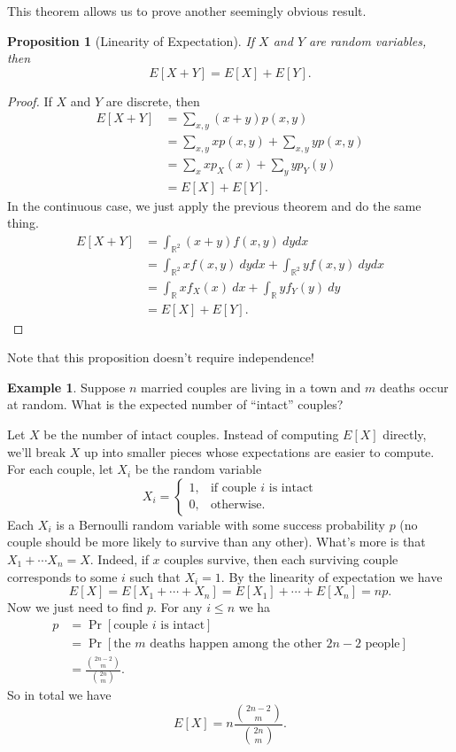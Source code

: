 \documentclass[12pt]{article}
\theoremstyle{plain}
\newtheorem{proposition}[theorem]{Proposition}
\theoremstyle{definition}
\newtheorem{example}[theorem]{Example}
\theoremstyle{remark}
\newcommand{\R}{\mathbb{R}}
\begin{document}
This theorem allows us to prove another seemingly obvious result.
\begin{proposition}[Linearity of Expectation]
    If $X$ and $Y$ are random variables, then
    \[
        E[X+Y] = E[X]+E[Y].
    \]
\end{proposition}
\begin{proof}
    If $X$ and $Y$ are discrete, then
    \begin{align*}
        E[X+Y] &= \sum_{x,y}(x+y)p(x,y)\\
        &= \sum_{x,y}xp(x,y) + \sum_{x,y}yp(x,y)\\
        &= \sum_x xp_X(x) + \sum_y yp_Y(y)\\
        &= E[X] + E[Y].
    \end{align*}
    In the continuous case, we just apply the previous theorem and do the same thing.
    \begin{align*}
        E[X+Y] &= \int_{\R^2}(x+y)f(x,y)\ dydx\\
        &= \int_{\R^2} xf(x,y)\ dydx + \int_{\R^2}yf(x,y)\ dydx\\
        &= \int_\R xf_X(x)\ dx + \int_\R yf_Y(y)\ dy\\
        &= E[X] + E[Y].
    \end{align*}
\end{proof}

Note that this proposition doesn't require independence!

\begin{example}
    Suppose $n$ married couples are living in a town and $m$ deaths occur at random.
    What is the expected number of ``intact'' couples?

    Let $X$ be the number of intact couples.
    Instead of computing $E[X]$ directly, we'll break $X$ up into smaller pieces whose expectations are easier to compute.
    For each couple, let $X_i$ be the random variable
    \[
        X_i = \begin{cases}
            1,&\text{if couple $i$ is intact}\\
            0,&\text{otherwise.}
        \end{cases}
    \]
    Each $X_i$ is a Bernoulli random variable with some success probability $p$ (no couple should be more likely to survive than any other).
    What's more is that $X_1+\cdots X_n = X$.
    Indeed, if $x$ couples survive, then each surviving couple corresponds to some $i$ such that $X_i = 1$.
    By the linearity of expectation we have
    \[
        E[X] = E[X_1 + \cdots + X_n] = E[X_1] + \cdots + E[X_n] = np.
    \]
    Now we just need to find $p$.
    For any $i\leq n$ we ha
    \begin{align*}
        p &= \Pr[\text{couple $i$ is intact}]\\
        &= \Pr[\text{the $m$ deaths happen among the other $2n-2$ people}]\\
        &= \frac{\binom{2n-2}{m}}{\binom{2n}{m}}.
    \end{align*}
    So in total we have
    \[
        E[X] = n\frac{\binom{2n-2}{m}}{\binom{2n}{m}}.
    \]
\end{example}
\end{document}
